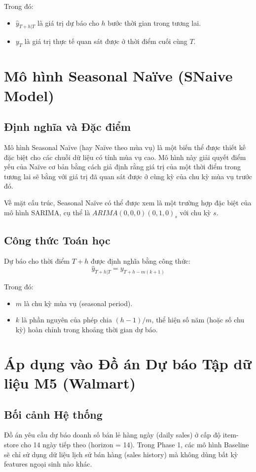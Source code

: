\documentclass[12pt,a4paper]{article}
\begin{document}
    Trong đó:
    \begin{itemize}
        \item $\hat{y}_{T+h|T}$ là giá trị dự báo cho $h$ bước thời gian trong tương lai.
        \item $y_T$ là giá trị thực tế quan sát được ở thời điểm cuối cùng $T$.
    \end{itemize}

    \section{Mô hình Seasonal Naïve (SNaive Model)}

    \subsection{Định nghĩa và Đặc điểm}
    Mô hình Seasonal Naïve (hay Naïve theo mùa vụ) là một biến thể được thiết kế đặc biệt cho các chuỗi dữ liệu có tính mùa vụ cao. Mô hình này giải quyết điểm yếu của Naïve cơ bản bằng cách giả định rằng giá trị của một thời điểm trong tương lai sẽ bằng với giá trị đã quan sát được ở cùng kỳ của chu kỳ mùa vụ trước đó.

    Về mặt cấu trúc, Seasonal Naïve có thể được xem là một trường hợp đặc biệt của mô hình SARIMA, cụ thể là $ARIMA(0, 0, 0)(0, 1, 0)_s$ với chu kỳ $s$.

    \subsection{Công thức Toán học}
    Dự báo cho thời điểm $T+h$ được định nghĩa bằng công thức:
    \[ \hat{y}_{T+h|T} = y_{T+h-m(k+1)} \]

    Trong đó:
    \begin{itemize}
        \item $m$ là chu kỳ mùa vụ (seasonal period).
        \item $k$ là phần nguyên của phép chia $(h-1)/m$, thể hiện số năm (hoặc số chu kỳ) hoàn chỉnh trong khoảng thời gian dự báo.
    \end{itemize}

    \section{Áp dụng vào Đồ án Dự báo Tập dữ liệu M5 (Walmart)}

    \subsection{Bối cảnh Hệ thống}
    Đồ án yêu cầu dự báo doanh số bán lẻ hàng ngày (daily sales) ở cấp độ item-store cho 14 ngày tiếp theo (horizon = 14). Trong Phase 1, các mô hình Baseline sẽ chỉ sử dụng dữ liệu lịch sử bán hàng (sales history) mà không dùng bất kỳ features ngoại sinh nào khác.
\end{document}
